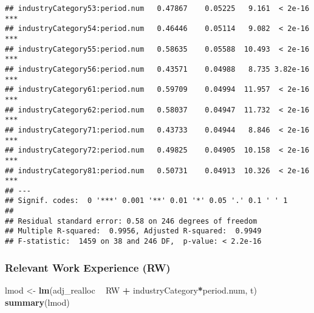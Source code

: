 \documentclass[
]{article}
\newenvironment{Shaded}{\begin{snugshade}}{\end{snugshade}}
\newcommand{\KeywordTok}[1]{\textcolor[rgb]{0.13,0.29,0.53}{\textbf{#1}}}
\newcommand{\NormalTok}[1]{#1}
\newcommand{\OperatorTok}[1]{\textcolor[rgb]{0.81,0.36,0.00}{\textbf{#1}}}
\newcommand{\StringTok}[1]{\textcolor[rgb]{0.31,0.60,0.02}{#1}}
\begin{document}
\begin{verbatim}
## industryCategory53:period.num   0.47867    0.05225   9.161  < 2e-16 ***
## industryCategory54:period.num   0.46446    0.05114   9.082  < 2e-16 ***
## industryCategory55:period.num   0.58635    0.05588  10.493  < 2e-16 ***
## industryCategory56:period.num   0.43571    0.04988   8.735 3.82e-16 ***
## industryCategory61:period.num   0.59709    0.04994  11.957  < 2e-16 ***
## industryCategory62:period.num   0.58037    0.04947  11.732  < 2e-16 ***
## industryCategory71:period.num   0.43733    0.04944   8.846  < 2e-16 ***
## industryCategory72:period.num   0.49825    0.04905  10.158  < 2e-16 ***
## industryCategory81:period.num   0.50731    0.04913  10.326  < 2e-16 ***
## ---
## Signif. codes:  0 '***' 0.001 '**' 0.01 '*' 0.05 '.' 0.1 ' ' 1
## 
## Residual standard error: 0.58 on 246 degrees of freedom
## Multiple R-squared:  0.9956, Adjusted R-squared:  0.9949 
## F-statistic:  1459 on 38 and 246 DF,  p-value: < 2.2e-16
\end{verbatim}

\hypertarget{relevant-work-experience-rw}{%
\subsubsection{Relevant Work Experience
(RW)}\label{relevant-work-experience-rw}}

\begin{Shaded}
\begin{Highlighting}[]
\NormalTok{lmod <-}\StringTok{ }\KeywordTok{lm}\NormalTok{(adj_realloc }\OperatorTok{~}\StringTok{  }\NormalTok{RW }\OperatorTok{+}\StringTok{ }\NormalTok{industryCategory}\OperatorTok{*}\NormalTok{period.num, t)}
\KeywordTok{summary}\NormalTok{(lmod)}
\end{Highlighting}
\end{Shaded}
\end{document}
